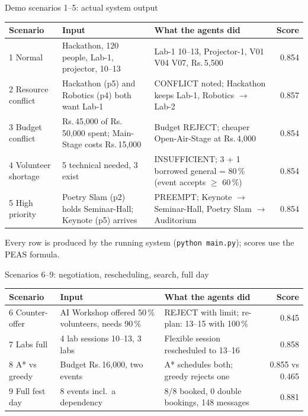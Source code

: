 \documentclass[aspectratio=169,11pt]{beamer}
\newcommand{\rs}{Rs.\,}
\begin{document}
\begin{frame}{Demo scenarios 1--5: actual system output}
  \scriptsize
  \begin{tabularx}{\textwidth}{@{}l X X r@{}}
    \toprule
    \textbf{Scenario} & \textbf{Input} & \textbf{What the agents did} & \textbf{Score} \\
    \midrule
    1 Normal        & Hackathon, 120 people, Lab-1, projector, 10--13 & Lab-1 10--13, Projector-1, V01 V04 V07, \rs 5{,}500 & 0.854 \\
    2 Resource conflict & Hackathon (p5) and Robotics (p4) both want Lab-1 & CONFLICT noted; Hackathon keeps Lab-1, Robotics $\rightarrow$ Lab-2 & 0.857 \\
    3 Budget conflict   & \rs 45{,}000 of \rs 50{,}000 spent; Main-Stage costs \rs 15{,}000 & Budget REJECT; cheaper Open-Air-Stage at \rs 4{,}000 & 0.854 \\
    4 Volunteer shortage & 5 technical needed, 3 exist & INSUFFICIENT; 3 + 1 borrowed general = 80\,\% (event accepts $\ge$ 60\,\%) & 0.854 \\
    5 High priority     & Poetry Slam (p2) holds Seminar-Hall; Keynote (p5) arrives & PREEMPT; Keynote $\rightarrow$ Seminar-Hall, Poetry Slam $\rightarrow$ Auditorium & 0.854 \\
    \bottomrule
  \end{tabularx}
  \vspace{6pt}
  {\footnotesize\color{muted} Every row is produced by the running system (\texttt{python main.py}); scores use the PEAS formula.}
\end{frame}

\begin{frame}{Scenarios 6--9: negotiation, rescheduling, search, full day}
  \scriptsize
  \begin{tabularx}{\textwidth}{@{}l X X r@{}}
    \toprule
    \textbf{Scenario} & \textbf{Input} & \textbf{What the agents did} & \textbf{Score} \\
    \midrule
    6 Counter-offer     & AI Workshop offered 50\,\% volunteers, needs 90\,\% & REJECT with limit; re-plan: 13--15 with 100\,\% & 0.845 \\
    7 Labs full         & 4 lab sessions 10--13, 3 labs & Flexible session rescheduled to 13--16 & 0.858 \\
    8 A* vs greedy      & Budget \rs 16{,}000, two events & A* schedules both; greedy rejects one & 0.855 vs 0.465 \\
    9 Full fest day     & 8 events incl.\ a dependency & 8/8 booked, 0 double bookings, 148 messages & 0.881 \\
    \bottomrule
  \end{tabularx}
\end{frame}
\end{document}
